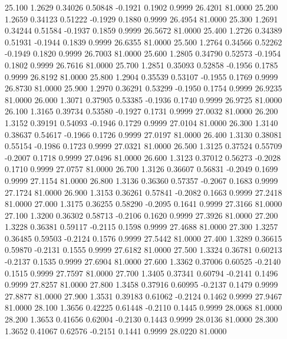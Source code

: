   25.100   1.2629   0.34026   0.50848  -0.1921   0.1902   0.9999  26.4201  81.0000
  25.200   1.2659   0.34123   0.51222  -0.1929   0.1880   0.9999  26.4954  81.0000
  25.300   1.2691   0.34244   0.51584  -0.1937   0.1859   0.9999  26.5672  81.0000
  25.400   1.2726   0.34389   0.51931  -0.1944   0.1839   0.9999  26.6355  81.0000
  25.500   1.2764   0.34566   0.52262  -0.1949   0.1820   0.9999  26.7003  81.0000
  25.600   1.2805   0.34790   0.52573  -0.1954   0.1802   0.9999  26.7616  81.0000
  25.700   1.2851   0.35093   0.52858  -0.1956   0.1785   0.9999  26.8192  81.0000
  25.800   1.2904   0.35539   0.53107  -0.1955   0.1769   0.9999  26.8730  81.0000
  25.900   1.2970   0.36291   0.53299  -0.1950   0.1754   0.9999  26.9235  81.0000
  26.000   1.3071   0.37905   0.53385  -0.1936   0.1740   0.9999  26.9725  81.0000
  26.100   1.3165   0.39734   0.53580  -0.1927   0.1731   0.9999  27.0032  81.0000
  26.200   1.3152   0.39191   0.54093  -0.1946   0.1729   0.9999  27.0104  81.0000
  26.300   1.3140   0.38637   0.54617  -0.1966   0.1726   0.9999  27.0197  81.0000
  26.400   1.3130   0.38081   0.55154  -0.1986   0.1723   0.9999  27.0321  81.0000
  26.500   1.3125   0.37524   0.55709  -0.2007   0.1718   0.9999  27.0496  81.0000
  26.600   1.3123   0.37012   0.56273  -0.2028   0.1710   0.9999  27.0757  81.0000
  26.700   1.3126   0.36607   0.56831  -0.2049   0.1699   0.9999  27.1154  81.0000
  26.800   1.3136   0.36360   0.57357  -0.2067   0.1683   0.9999  27.1724  81.0000
  26.900   1.3153   0.36261   0.57841  -0.2082   0.1663   0.9999  27.2418  81.0000
  27.000   1.3175   0.36255   0.58290  -0.2095   0.1641   0.9999  27.3166  81.0000
  27.100   1.3200   0.36302   0.58713  -0.2106   0.1620   0.9999  27.3926  81.0000
  27.200   1.3228   0.36381   0.59117  -0.2115   0.1598   0.9999  27.4688  81.0000
  27.300   1.3257   0.36485   0.59503  -0.2124   0.1576   0.9999  27.5442  81.0000
  27.400   1.3289   0.36615   0.59870  -0.2131   0.1555   0.9999  27.6182  81.0000
  27.500   1.3324   0.36781   0.60213  -0.2137   0.1535   0.9999  27.6904  81.0000
  27.600   1.3362   0.37006   0.60525  -0.2140   0.1515   0.9999  27.7597  81.0000
  27.700   1.3405   0.37341   0.60794  -0.2141   0.1496   0.9999  27.8257  81.0000
  27.800   1.3458   0.37916   0.60995  -0.2137   0.1479   0.9999  27.8877  81.0000
  27.900   1.3531   0.39183   0.61062  -0.2124   0.1462   0.9999  27.9467  81.0000
  28.100   1.3656   0.42225   0.61448  -0.2110   0.1445   0.9999  28.0068  81.0000
  28.200   1.3653   0.41656   0.62004  -0.2130   0.1443   0.9999  28.0136  81.0000
  28.300   1.3652   0.41067   0.62576  -0.2151   0.1441   0.9999  28.0220  81.0000
